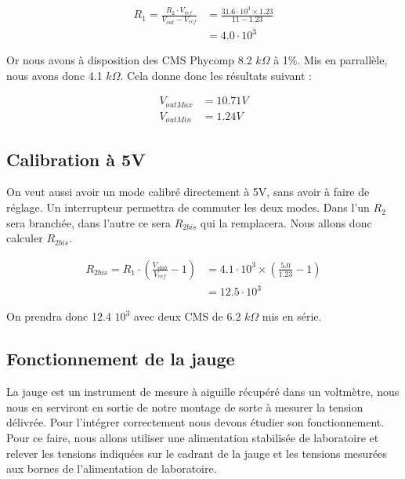 \documentclass[12pt]{article}
\begin{document}
\begin{equation}
	\begin{split}
		R_1 = \frac{R_2 \cdot V_{ref}}{V_{out} - V_{ref}} & = \frac{31.6 \cdot 10^3 \times 1.23}{11 - 1.23} \\
								  & = 4.0 \cdot 10^3
	\end{split}
\end{equation}

Or nous avons à disposition des CMS Phycomp 8.2 $k\Omega$ à 1\%. Mis en parrallèle, nous avons donc 4.1 $k\Omega$. Cela
donne donc les résultats suivant :

\begin{align}
	V_{out Max}& = 10.71 V \\
	V_{out Min}& = 1.24 V
\end{align}


\subsection{Calibration à 5V}\label{calcul5V}

On veut aussi avoir un mode calibré directement à 5V, sans avoir à faire de réglage. Un interrupteur permettra de
commuter les deux modes. Dans l'un  $R_2$ sera branchée, dans l'autre ce sera $R_{2bis}$ qui la remplacera. Nous
allons donc calculer $R_{2bis}$.

\begin{equation}
	\begin{split}
		R_{2bis} = R_1 \cdot ( \frac{V_{stab}}{V_{ref}} - 1)& = 4.1 \cdot 10^3 \times (\frac{5.0}{1.23} - 1) \\
									& = 12.5 \cdot 10^3
	\end{split}
\end{equation}

On prendra donc 12.4 $10^3$ avec deux CMS de 6.2 $k\Omega$ mis en série.


\subsection{Fonctionnement de la jauge}

La jauge est un instrument de mesure à aiguille récupéré dans un voltmètre, nous nous en serviront en sortie de notre 
montage de sorte à mesurer la tension délivrée. Pour l'intégrer correctement nous devons étudier son fonctionnement.
Pour ce faire, nous allons utiliser une alimentation stabilisée de laboratoire et relever les tensions indiquées 
sur le cadrant de la jauge et les tensions mesurées aux bornes de l'alimentation de laboratoire.
\end{document}
